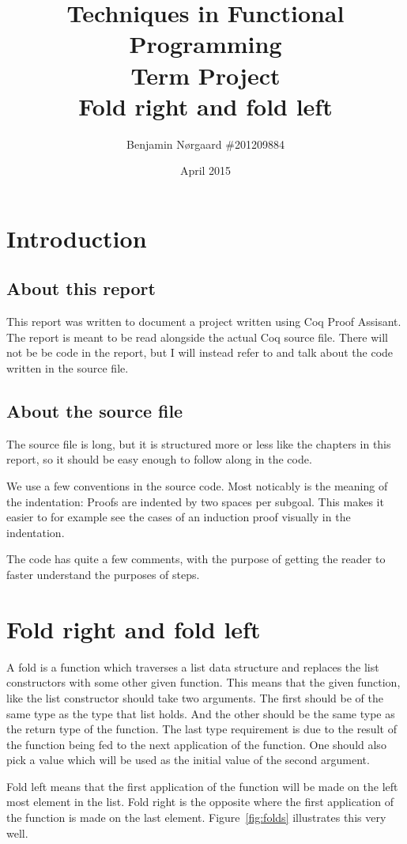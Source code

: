 \documentclass[a4paper]{article}
\title{Techniques in Functional Programming\\
Term Project\\
Fold right and fold left}
\author{Benjamin Nørgaard \#201209884}
\date{April 2015}
\begin{document}
\maketitle
\tableofcontents
\clearpage
\section{Introduction}

\subsection{About this report}
This report was written to document a project written using Coq Proof Assisant.
The report is meant to be read alongside the actual Coq source file. There will
not be be code in the report, but I will instead refer to and talk about the
code written in the source file.

\subsection{About the source file}
The source file is long, but it is structured more or less like the chapters in
this report, so it should be easy enough to follow along in the code.

We use a few conventions in the source code. Most noticably is the meaning of the
indentation: Proofs are indented by two spaces per subgoal. This makes it easier
to for example see the cases of an induction proof visually in the indentation.

The code has quite a few comments, with the purpose of getting the reader to
faster understand the purposes of steps.

\section{Fold right and fold left}
A fold is a function which traverses a list data structure and replaces the list
constructors with some other given function. This means that the given
function, like the list constructor should take two arguments.
The first should be of the same type as the type that list holds.
And the other should be the same type as the return type of the function.
The last type requirement is due to the result of the
function being fed to the next application of the function. One should also
pick a value which will be used as the initial value of the second argument.

Fold left means that the first application of the function will be made on
the left most element in the list. Fold right is the opposite where the first
application of the function is made on the last element. Figure~\ref{fig:folds}
illustrates this very well.
\end{document}
